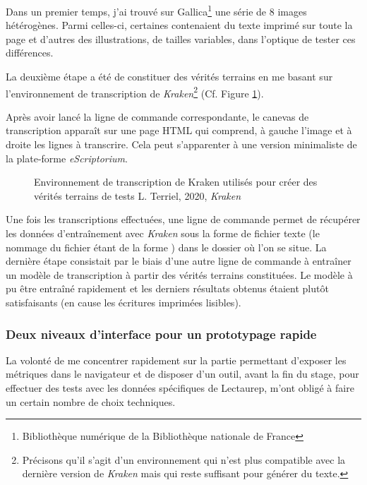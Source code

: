 Dans un premier temps, j'ai trouvé sur Gallica\footnote{Bibliothèque numérique de la Bibliothèque nationale de France} une série de 8 images hétérogènes. Parmi celles-ci, certaines contenaient du texte imprimé sur toute la page et d'autres des illustrations, de tailles variables, dans l'optique de tester ces différences. 

La deuxième étape a été de constituer des vérités terrains en me basant sur l'environnement de transcription de \textit{Kraken}\footnote{Précisons qu'il s'agit d'un environnement  qui n'est plus compatible avec la dernière version de \textit{Kraken} mais qui reste suffisant pour générer du texte.} (Cf. Figure \ref{fig:transcrire_kraken}). 

Après avoir lancé la ligne de commande correspondante, le canevas de transcription apparaît sur une page HTML qui comprend, à gauche l'image et à droite les lignes à transcrire. Cela peut s'apparenter à une version minimaliste de la plate-forme \textit{eScriptorium}.   

\begin{figure}[H]
    \centering
    \centerline{}
    \caption{Environnement de transcription de Kraken utilisés pour créer des vérités terrains de tests \textcopyright L. Terriel, 2020, \textit{Kraken}}
    \label{fig:transcrire_kraken}
\end{figure}

Une fois les transcriptions effectuées, une ligne de commande permet de récupérer les données d'entraînement avec \textit{Kraken} sous la forme de fichier texte (le nommage du fichier étant de la forme ) dans le dossier où l'on se situe. La dernière étape consistait par le biais d'une autre ligne de commande à entraîner un modèle de transcription à partir des vérités terrains constituées. Le modèle à pu être entraîné rapidement et les derniers résultats obtenus étaient plutôt satisfaisants (en cause les écritures imprimées lisibles). 

\subsubsection{Deux niveaux d'interface pour un prototypage rapide}

La volonté de me concentrer rapidement sur la partie permettant d'exposer les métriques dans le navigateur et de disposer d'un outil, avant la fin du stage, pour effectuer des tests avec les données spécifiques de Lectaurep, m'ont obligé à faire un certain nombre de choix techniques. 

